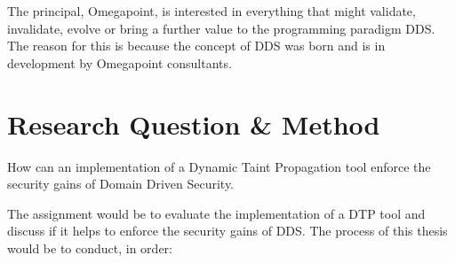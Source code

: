 \documentclass{../kththesis}
\begin{document}
The principal, Omegapoint, is interested in everything that might validate, invalidate, evolve or bring a further value to the programming paradigm DDS. The reason for this is because the concept of DDS was born and is in development by Omegapoint consultants. 


\chapter{Research Question \& Method}
\begin{chapquote}{}
	How can an implementation of a Dynamic Taint Propagation tool enforce the security gains of Domain Driven Security.
\end{chapquote}

\noindent
The assignment would be to evaluate the implementation of a DTP tool and discuss if it helps to enforce the security gains of DDS. The process of this thesis would be to conduct, in order:
\end{document}
